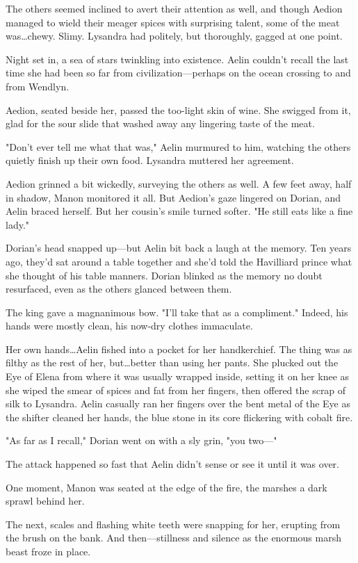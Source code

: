 The others seemed inclined to avert their attention as well, and though Aedion managed to wield their meager spices with surprising talent, some of the meat was\ldots chewy.
Slimy.
Lysandra had politely, but thoroughly, gagged at one point.

Night set in, a sea of stars twinkling into existence.
Aelin couldn't recall the last time she had been so far from civilization---perhaps on the ocean crossing to and from Wendlyn.

Aedion, seated beside her, passed the too-light skin of wine.
She swigged from it, glad for the sour slide that washed away any lingering taste of the meat.

"Don't ever tell me what that was," Aelin murmured to him, watching the others quietly finish up their own food.
Lysandra muttered her agreement.

Aedion grinned a bit wickedly, surveying the others as well.
A few feet away, half in shadow, Manon monitored it all.
But Aedion's gaze lingered on Dorian, and Aelin braced herself.
But her cousin's smile turned softer.
"He still eats like a fine lady."

Dorian's head snapped up---but Aelin bit back a laugh at the memory.
Ten years ago, they'd sat around a table together and she'd told the Havilliard prince what she thought of his table manners.
Dorian blinked as the memory no doubt resurfaced, even as the others glanced between them.

The king gave a magnanimous bow.
"I'll take that as a compliment."
Indeed, his hands were mostly clean, his now-dry clothes immaculate.

Her own hands\ldots Aelin fished into a pocket for her handkerchief.
The thing was as filthy as the rest of her, but\ldots better than using her pants.
She plucked out the Eye of Elena from where it was usually wrapped inside, setting it on her knee as she wiped the smear of spices and fat from her fingers, then offered the scrap of silk to Lysandra.
Aelin casually ran her fingers over the bent metal of the Eye as the shifter cleaned her hands, the blue stone in its core flickering with cobalt fire.

"As far as I recall," Dorian went on with a sly grin, "you two---"

The attack happened so fast that Aelin didn't sense or see it until it was over.

One moment, Manon was seated at the edge of the fire, the marshes a dark sprawl behind her.

The next, scales and flashing white teeth were snapping for her, erupting from the brush on the bank.
And then---stillness and silence as the enormous marsh beast froze in place.

